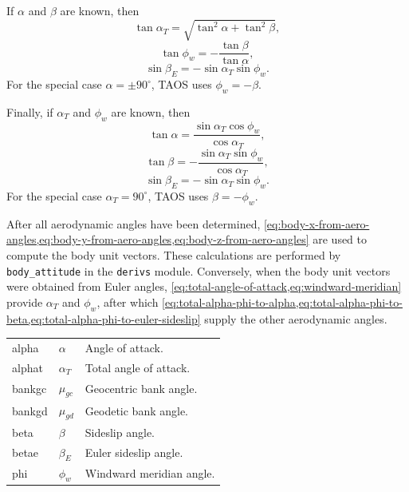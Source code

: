If $\alpha$ and $\beta$ are known, then
\begin{equation}
  \tan\alpha_T=\sqrt{\tan^2\alpha+\tan^2\beta},
  \label{eq:alpha-beta-to-total-alpha}
\end{equation}
\begin{equation}
  \tan\phi_w=-\frac{\tan\beta}{\tan\alpha},
  \label{eq:alpha-beta-to-windward-meridian}
\end{equation}
\begin{equation}
  \sin\beta_E=-\sin\alpha_T\sin\phi_w.
  \label{eq:alpha-beta-to-euler-sideslip}
\end{equation}
For the special case $\alpha=\pm90^\circ$, TAOS uses $\phi_w=-\beta$.

Finally, if $\alpha_T$ and $\phi_w$ are known, then
\begin{equation}
  \tan\alpha
  =\frac{\sin\alpha_T\cos\phi_w}{\cos\alpha_T},
  \label{eq:total-alpha-phi-to-alpha}
\end{equation}
\begin{equation}
  \tan\beta
  =-\frac{\sin\alpha_T\sin\phi_w}{\cos\alpha_T},
  \label{eq:total-alpha-phi-to-beta}
\end{equation}
\begin{equation}
  \sin\beta_E=-\sin\alpha_T\sin\phi_w.
  \label{eq:total-alpha-phi-to-euler-sideslip}
\end{equation}
For the special case $\alpha_T=90^\circ$, TAOS uses $\beta=-\phi_w$.

After all aerodynamic angles have been determined,
\cref{eq:body-x-from-aero-angles,eq:body-y-from-aero-angles,eq:body-z-from-aero-angles}
are used to compute the body unit vectors. These calculations are performed by
\texttt{body\_attitude} in the \texttt{derivs} module. Conversely, when the body
unit vectors were obtained from Euler angles, \cref{eq:total-angle-of-attack,eq:windward-meridian} provide $\alpha_T$ and $\phi_w$, after which
\cref{eq:total-alpha-phi-to-alpha,eq:total-alpha-phi-to-beta,eq:total-alpha-phi-to-euler-sideslip} supply the other aerodynamic angles.


\begin{longtable}{@{}>{\ttfamily}p{}p{}p{}@{}}
  alpha  & $\alpha$ & Angle of attack.\\
  alphat & $\alpha_T$ & Total angle of attack.\\
  bankgc & $\mu_{gc}$ & Geocentric bank angle.\\
  bankgd & $\mu_{gd}$ & Geodetic bank angle.\\
  beta   & $\beta$ & Sideslip angle.\\
  betae  & $\beta_E$ & Euler sideslip angle.\\
  phi    & $\phi_w$ & Windward meridian angle.\\
\end{longtable}

